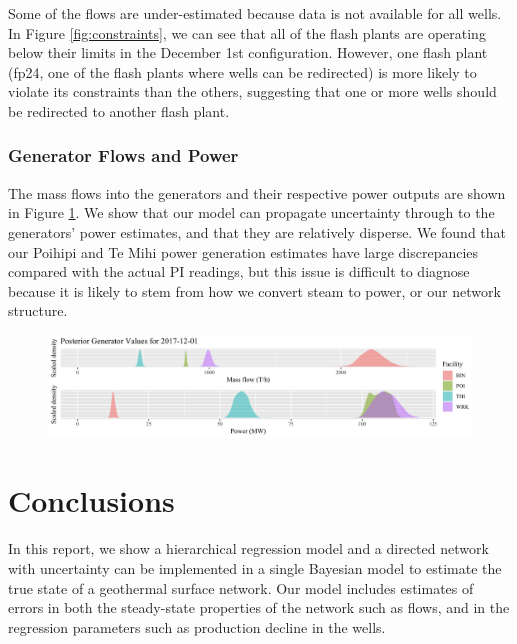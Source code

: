 \documentclass[a4paper, 12pt]{article}
\begin{document}
Some of the flows are under-estimated because data is not available for all wells. In Figure \ref{fig:constraints}, we can see that all of the flash plants are operating below their limits in the December 1st configuration. However, one flash plant (fp24, one of the flash plants where wells can be redirected) is more likely to violate its constraints than the others, suggesting that one or more wells should be redirected to another flash plant.

\subsubsection{Generator Flows and Power}
The mass flows into the generators and their respective power outputs are shown in Figure \ref{fig:gens}. We show that our model can propagate uncertainty through to the generators' power estimates, and that they are relatively disperse. We found that our Poihipi and Te Mihi power generation estimates have large discrepancies compared with the actual PI readings, but this issue is difficult to diagnose because it is likely to stem from how we convert steam to power, or our network structure.

\begin{figure}
\centering
  \includegraphics[width=\linewidth]{media/gens}
  \label{fig:gens}
\end{figure}

\section{Conclusions}
In this report, we show a hierarchical regression model and a directed network with uncertainty can be implemented in a single Bayesian model to estimate the true state of a geothermal surface network. Our model includes estimates of errors in both the steady-state properties of the network such as flows, and in the regression parameters such as production decline in the wells.
\end{document}
